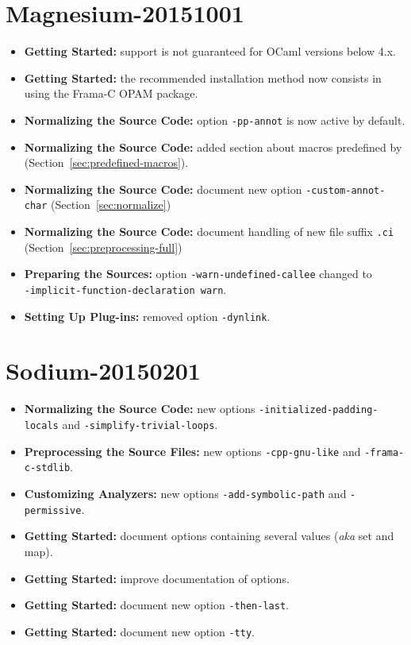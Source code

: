 \section*{Magnesium-20151001}
\begin{itemize}
\item \textbf{Getting Started:} support is not guaranteed for OCaml versions
below 4.x.
\item \textbf{Getting Started:} the recommended installation method now consists
in using the Frama-C OPAM package.
\item \textbf{Normalizing the Source Code:} option \texttt{-pp-annot} is now
active by default.
\item \textbf{Normalizing the Source Code:} added section about macros
predefined by \FramaC (Section~\ref{sec:predefined-macros}).
\item \textbf{Normalizing the Source Code:} document new option
  \texttt{-custom-annot-char} (Section~\ref{sec:normalize})
\item \textbf{Normalizing the Source Code:} document handling of
  new file suffix \texttt{.ci} (Section~\ref{sec:preprocessing-full})
\item \textbf{Preparing the Sources:} option \texttt{-warn-undefined-callee}
  changed to \\ \texttt{-implicit-function-declaration warn}.
\item \textbf{Setting Up Plug-ins:} removed option \texttt{-dynlink}.
\end{itemize}

\section*{Sodium-20150201}
\begin{itemize}
\item \textbf{Normalizing the Source Code:} new options
  \texttt{-initialized-padding-locals} and \texttt{-simplify-trivial-loops}.
\item \textbf{Preprocessing the Source Files:} new options
  \texttt{-cpp-gnu-like} and \texttt{-frama-c-stdlib}.
\item \textbf{Customizing Analyzers:} new options
  \texttt{-add-symbolic-path} and \texttt{-permissive}.
\item \textbf{Getting Started:} document options containing several values
  (\emph{aka} set and map).
\item \textbf{Getting Started:} improve documentation of options.
\item \textbf{Getting Started:} document new option \texttt{-then-last}.
\item \textbf{Getting Started:} document new option \texttt{-tty}.
\end{itemize}

